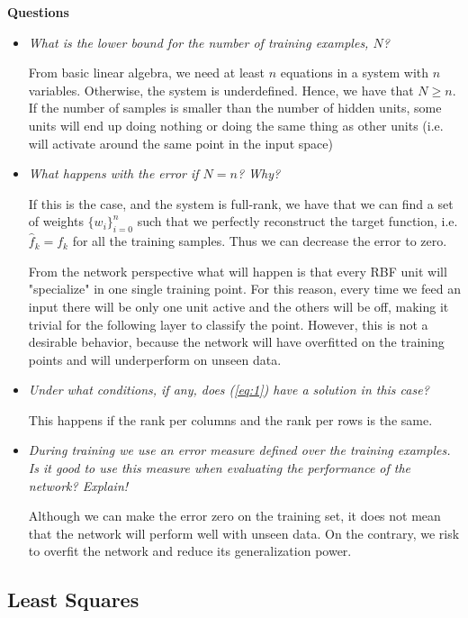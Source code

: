 \documentclass[letterpaper, 10 pt, conference]{ieeeconf}  %
\begin{document}
\begin{framed}
\textbf{Questions}
\begin{itemize}
\item \textit{What is the lower bound for the number of training examples, $N$?}

From basic linear algebra, we need at least $n$ equations in a system with $n$ variables. Otherwise, the system is underdefined. Hence, we have that $N\geq n$. If the number of samples is smaller than the number of hidden units, some units will end up doing nothing or doing the same thing as other units (i.e. will activate around the same point in the input space)

\item \textit{What happens with the error if $N=n$? Why?}

If this is the case, and the system is full-rank, we have that we can find a set of weights $\{w_i\}_{i=0}^n$ such that we perfectly reconstruct the target function, i.e. $\hat{f}_k = f_k$ for all the training samples. Thus we can decrease the error to zero.

From the network perspective what will happen is that every RBF unit will "specialize" in one single training point. For this reason, every time we feed an input there will be only one unit active and the others will be off, making it trivial for the following layer to classify the point. However, this is not a desirable behavior, because the network will have overfitted on the training points and will underperform on unseen data.

\item \textit{Under what conditions, if any, does (\ref{eq:1}) have a solution in this case?}

This happens if the rank per columns and the rank per rows is the same.

\item \textit{During training we use an error measure defined over the training examples. Is it good to use this measure when evaluating the performance of the network? Explain!}

Although we can make the error zero on the training set, it does not mean that the network will perform well with unseen data. On the contrary, we risk to overfit the network and reduce its generalization power.

\end{itemize}
\end{framed}

\subsection{Least Squares}
\end{document}
